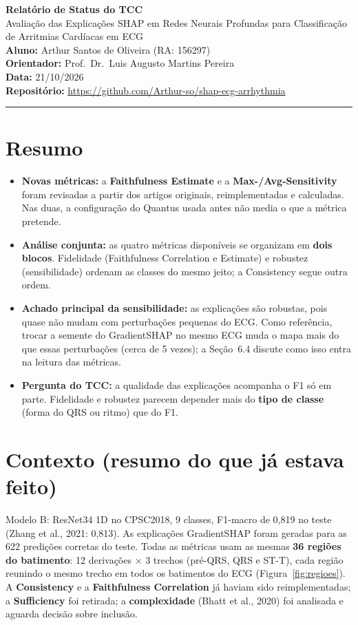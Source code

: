 \documentclass[11pt,a4paper]{article}
\begin{document}
\begin{center}
    {\LARGE \textbf{Relatório de Status do TCC}} \\[0.35em]
    {\large Avaliação das Explicações SHAP em Redes Neurais Profundas para Classificação de Arritmias Cardíacas em ECG} \\[0.3em]
    \textbf{Aluno:} Arthur Santos de Oliveira (RA: 156297) \\[0.2em]
    \textbf{Orientador:} Prof.\ Dr.\ Luis Augusto Martins Pereira \\[0.2em]
    \textbf{Data:} 21/10/2026 \\[0.2em]
    \textbf{Repositório:} \url{https://github.com/Arthur-so/shap-ecg-arrhythmia}
\end{center}
\vspace{-0.5em}
\hrule
\vspace{0.8em}

\section{Resumo}
\begin{itemize}
    \item \textbf{Novas métricas:} a \textbf{Faithfulness Estimate} e a \textbf{Max-/Avg-Sensitivity} foram revisadas a partir dos artigos originais, reimplementadas e calculadas. Nas duas, a configuração do Quantus usada antes não media o que a métrica pretende.
    \item \textbf{Análise conjunta:} as quatro métricas disponíveis se organizam em \textbf{dois blocos}. Fidelidade (Faithfulness Correlation e Estimate) e robustez (sensibilidade) ordenam as classes do mesmo jeito; a Consistency segue outra ordem.
    \item \textbf{Achado principal da sensibilidade:} as explicações são robustas, pois quase não mudam com perturbações pequenas do ECG. Como referência, trocar a semente do GradientSHAP no mesmo ECG muda o mapa mais do que essas perturbações (cerca de 5 vezes); a Seção~6.4 discute como isso entra na leitura das métricas.
    \item \textbf{Pergunta do TCC:} a qualidade das explicações acompanha o F1 só em parte. Fidelidade e robustez parecem depender mais do \textbf{tipo de classe} (forma do QRS ou ritmo) que do F1.
\end{itemize}

\section{Contexto (resumo do que já estava feito)}
Modelo B: ResNet34 1D no CPSC2018, 9 classes, F1-macro de 0,819 no teste (Zhang et al., 2021: 0,813). As explicações GradientSHAP foram geradas para as 622 predições corretas do teste. Todas as métricas usam as mesmas \textbf{36 regiões do batimento}: 12 derivações × 3 trechos (pré-QRS, QRS e ST-T), cada região reunindo o mesmo trecho em todos os batimentos do ECG (Figura~\ref{fig:regioes}). A \textbf{Consistency} e a \textbf{Faithfulness Correlation} já haviam sido reimplementadas; a \textbf{Sufficiency} foi retirada; a \textbf{complexidade} (Bhatt et al., 2020) foi analisada e aguarda decisão sobre inclusão.
\end{document}
